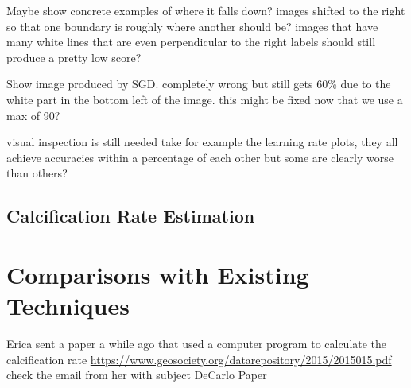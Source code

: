 Maybe show concrete examples of where it falls down? images shifted to the right so that one boundary is roughly where another should be? images that have many white lines that are even perpendicular to the right labels should still produce a pretty low score?

Show image produced by SGD. completely wrong but still gets 60\% due to the white part in the bottom left of the image. this might be fixed now that we use a max of 90?

visual inspection is still needed take for example the learning rate plots, they all achieve accuracies within a percentage of each other but some are clearly worse than others?

\subsection{Calcification Rate Estimation}

\section{Comparisons with Existing Techniques}

Erica sent a paper a while ago that used a computer program to calculate the calcification rate  \url{https://www.geosociety.org/datarepository/2015/2015015.pdf} check the email from her with subject DeCarlo Paper





